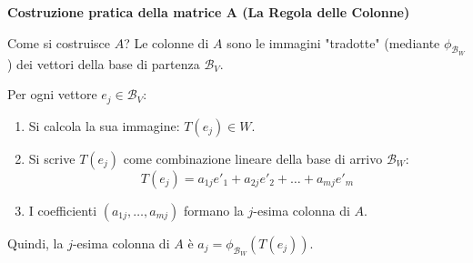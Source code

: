 {    \bigskip
    \textbf{Costruzione pratica della matrice A (La Regola delle Colonne)}
    
    Come si costruisce \(A\)? Le colonne di \(A\) sono le immagini "tradotte" (mediante \(\phi_{\mathcal{B}_W}\)) dei vettori della base di partenza \(\mathcal{B}_V\).
    
    Per ogni vettore \(e_j \in \mathcal{B}_V\):
    \begin{enumerate}
        \item Si calcola la sua immagine: \(T(e_j) \in W\).
        \item Si scrive \(T(e_j)\) come combinazione lineare della base di arrivo \(\mathcal{B}_W\):
        \[ T(e_j) = a_{1j} e'_1 + a_{2j} e'_2 + \dots + a_{mj} e'_m \]
        \item I coefficienti \( (a_{1j}, \dots, a_{mj}) \) formano la \(j\)-esima colonna di \(A\).
    \end{enumerate}
    Quindi, la \(j\)-esima colonna di \(A\) è \(a_j = \phi_{\mathcal{B}_W}(T(e_j))\).
    
    \bigskip
    
}


